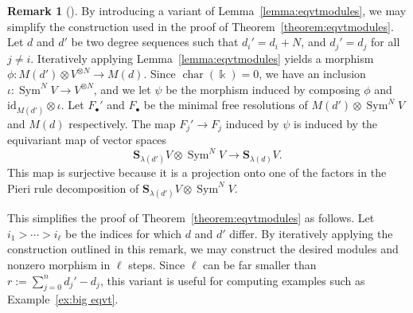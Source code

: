 \documentclass[12pt]{amsart}
\theoremstyle{definition}
\newtheorem{rmk}[equation]{Remark}
\newenvironment{remark}[1][]{\begin{rmk}[#1] \pushQED{\qed}}{\popQED \end{rmk}}
\newcommand{\ch}{\operatorname{char}}
\newcommand{\Sc}{\mathbf{S}}
\newcommand{\Sym}{\operatorname{Sym}}
\begin{document}
\begin{remark}\label{rmk:simpler}
  By introducing a variant of Lemma~\ref{lemma:eqvtmodules}, we may
  simplify the construction used in the proof of
  Theorem~\ref{theorem:eqvtmodules}.  Let $d$ and $d'$ be two degree
  sequences such that $d_i'=d_i+N$, and $d_j'=d_j$ for all $j\ne i$.
  Iteratively applying Lemma~\ref{lemma:eqvtmodules} yields a morphism
  $\phi \colon M(d')\otimes V^{\otimes N}\to M(d)$.  Since
  $\ch(\Bbbk)=0$, we have an inclusion $\iota \colon \Sym^N V\to
  V^{\otimes N}$, and we let $\psi$ be the morphism induced by
  composing $\phi$ and $\text{id}_{M(d')}\otimes \iota$.  Let
  $F_\bullet'$ and $F_\bullet$ be the minimal free resolutions of
  $M(d')\otimes \Sym^N V$ and $M(d)$ respectively.  The map $F_j'\to
  F_j$ induced by $\psi$ is induced by the equivariant map of vector spaces
\[
\Sc_{\lambda(d')}V\otimes \Sym^NV\to \Sc_{\lambda(d)}V.
\]
This map is surjective because it is a projection onto one of the factors in the Pieri rule decomposition of
$\Sc_{\lambda(d')}V\otimes \Sym^NV$.  

This simplifies the proof of Theorem~\ref{theorem:eqvtmodules} as follows.  Let $i_1 > \cdots > i_\ell$ be the indices for which $d$ and $d'$ differ. By iteratively applying the construction outlined in this remark, we may  construct the desired modules and nonzero morphism in $\ell$ steps.  Since $\ell$ can be far smaller than $r:=\sum_{j=0}^n d_j'-d_j$, this variant is useful for computing examples such as Example~\ref{ex:big eqvt}.
\end{remark}
\end{document}
